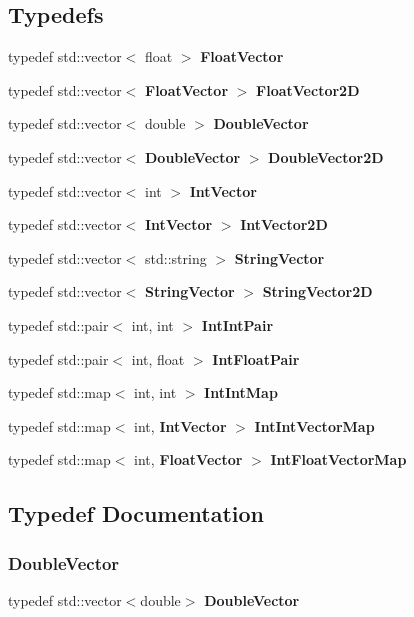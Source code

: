 \subsection*{Typedefs}
\begin{DoxyCompactItemize}
\item 
typedef std\+::vector$<$ float $>$ \textbf{ Float\+Vector}
\item 
typedef std\+::vector$<$ \textbf{ Float\+Vector} $>$ \textbf{ Float\+Vector2D}
\item 
typedef std\+::vector$<$ double $>$ \textbf{ Double\+Vector}
\item 
typedef std\+::vector$<$ \textbf{ Double\+Vector} $>$ \textbf{ Double\+Vector2D}
\item 
typedef std\+::vector$<$ int $>$ \textbf{ Int\+Vector}
\item 
typedef std\+::vector$<$ \textbf{ Int\+Vector} $>$ \textbf{ Int\+Vector2D}
\item 
typedef std\+::vector$<$ std\+::string $>$ \textbf{ String\+Vector}
\item 
typedef std\+::vector$<$ \textbf{ String\+Vector} $>$ \textbf{ String\+Vector2D}
\item 
typedef std\+::pair$<$ int, int $>$ \textbf{ Int\+Int\+Pair}
\item 
typedef std\+::pair$<$ int, float $>$ \textbf{ Int\+Float\+Pair}
\item 
typedef std\+::map$<$ int, int $>$ \textbf{ Int\+Int\+Map}
\item 
typedef std\+::map$<$ int, \textbf{ Int\+Vector} $>$ \textbf{ Int\+Int\+Vector\+Map}
\item 
typedef std\+::map$<$ int, \textbf{ Float\+Vector} $>$ \textbf{ Int\+Float\+Vector\+Map}
\end{DoxyCompactItemize}


\subsection{Typedef Documentation}
\mbox{\label{_data_types_8h_a82f6bc76e1c7a0f51bf3e95ad5d3c590}} 
\subsubsection{Double\+Vector}
{\footnotesize\ttfamily typedef std\+::vector$<$double$>$ \textbf{ Double\+Vector}}



